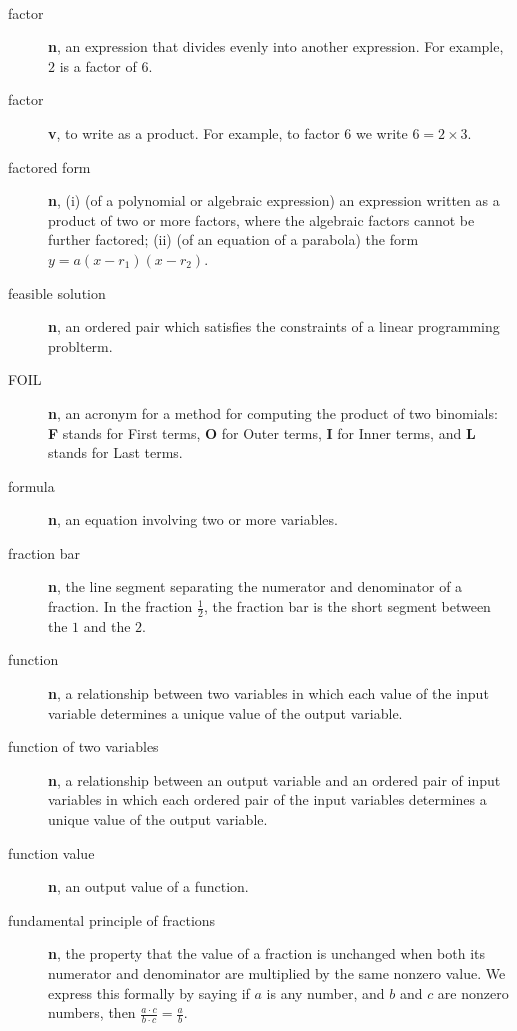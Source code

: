 \documentclass[10pt,]{book}
\newcommand{\terminology}[1]{\textbf{#1}}
\theoremstyle{plain}
\theoremstyle{definition}
\theoremstyle{definition}
\theoremstyle{definition}
\numberwithin{equation}{part}
\begin{document}
\paragraph[{}]{}\hypertarget{paragraphs-10}{}
\leavevmode%
\begin{description}
\item[{factor}]\hypertarget{li-586}{}\terminology{n}, an expression that divides evenly into another expression. For example, \(2\) is a factor of \(6\).%
\item[{factor}]\hypertarget{li-587}{}\terminology{v}, to write as a product. For example, to factor \(6\) we write \(6 = 2\times 3\).%
\item[{factored form}]\hypertarget{li-588}{}\terminology{n}, (i) (of a polynomial or algebraic expression) an expression written as a product of two or more factors, where the algebraic factors cannot be further factored; (ii) (of an equation of a parabola) the form \(y = a(x − r_1)(x − r_2)\).%
\item[{feasible solution}]\hypertarget{li-589}{}\terminology{n}, an ordered pair which satisfies the constraints of a linear programming problterm.%
\item[{FOIL}]\hypertarget{li-590}{}\terminology{n}, an acronym for a method for computing the product of two binomials: \terminology{F} stands for First terms, \terminology{O} for Outer terms, \terminology{I} for Inner terms, and \terminology{L} stands for Last terms.%
\item[{formula}]\hypertarget{li-591}{}\terminology{n}, an equation involving two or more variables.%
\item[{fraction bar}]\hypertarget{li-592}{}\terminology{n}, the line segment separating the numerator and denominator of a fraction. In the fraction \(\frac{1}{2} \), the fraction bar is the short segment between the \(1\) and the \(2\).%
\item[{function}]\hypertarget{li-593}{}\terminology{n}, a relationship between two variables in which each value of the input variable determines a unique value of the output variable.%
\item[{function of two variables}]\hypertarget{li-594}{}\terminology{n}, a relationship between an output variable and an ordered pair of input variables in which each ordered pair of the input variables determines a unique value of the output variable.%
\item[{function value}]\hypertarget{li-595}{}\terminology{n}, an output value of a function.%
\item[{fundamental principle of fractions}]\hypertarget{li-596}{}\terminology{n}, the property that the value of a fraction is unchanged when both its numerator and denominator are multiplied by the same nonzero value. We express this formally by saying if \(a\) is any number, and \(b\) and \(c\) are nonzero numbers, then \(\displaystyle{\frac{a\cdot c}{b\cdot c}=\frac{a}{b}} \).%
\end{description}
%
\typeout{************************************************}
\typeout{************************************************}
\end{document}
